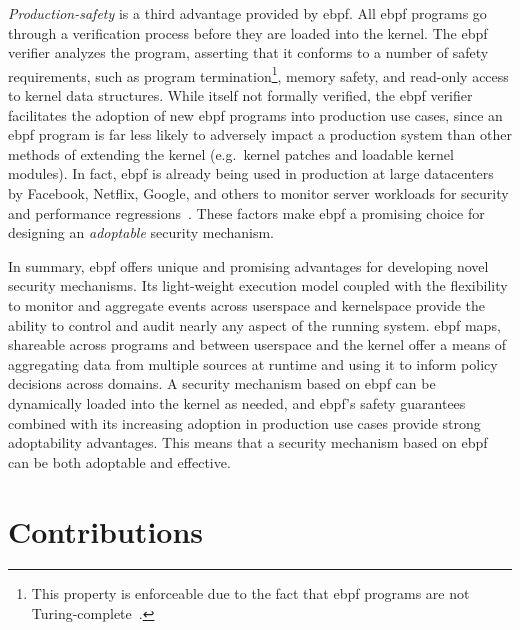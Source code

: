 \textit{Production-safety} is a third advantage provided by \gls{ebpf}. All \gls{ebpf} programs go
through a verification process before they are loaded into the kernel. The \gls{ebpf} verifier
analyzes the program, asserting that it conforms to a number of safety requirements, such
as program termination\footnote{This property is enforceable due to the fact that \gls{ebpf}
programs are not Turing-complete~\cite{gregg2019_bpf}.}, memory safety, and read-only
access to kernel data structures. While itself not formally verified, the \gls{ebpf} verifier
facilitates the adoption of new \gls{ebpf} programs into production use cases, since an \gls{ebpf}
program is far less likely to adversely impact a production system than other methods of
extending the kernel (e.g.\ kernel patches and loadable kernel modules). In fact, \gls{ebpf} is
already being used in production at large datacenters by Facebook, Netflix, Google, and
others to monitor server workloads for security and performance
regressions~\cite{gregg2019_bpf}. These factors make \gls{ebpf} a promising choice for
designing an \textit{adoptable} security mechanism.

In summary, \gls{ebpf} offers unique and promising advantages for developing novel security
mechanisms. Its light-weight execution model coupled with the flexibility to monitor and
aggregate events across userspace and kernelspace provide the ability to control and audit
nearly any aspect of the running system. \gls{ebpf} maps, shareable across programs and between
userspace and the kernel offer a means of aggregating data from multiple sources at
runtime and using it to inform policy decisions across domains. A security mechanism based
on \gls{ebpf} can be dynamically loaded into the kernel as needed, and \gls{ebpf}'s safety guarantees
combined with its increasing adoption in production use cases provide strong adoptability
advantages. This means that a security mechanism based on \gls{ebpf} can be both adoptable and
effective.


\section{Contributions}%
\label{s:contributions}

